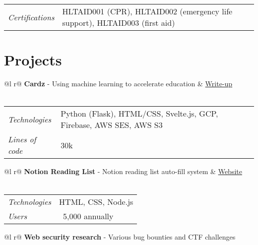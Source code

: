 \documentclass[a4paper,11pt]{article}
\begin{document}
\begin{tabularx}{\linewidth}{l X}
    \textit{Certifications} & \hfill HLTAID001 (CPR), HLTAID002 (emergency life support), HLTAID003 (first aid) \\
\end{tabularx}

\section{Projects}

\begin{tabularx}{\linewidth}{ @{}l r@{} }
\textbf{Cardz} - Using machine learning to accelerate education & \hfill \href{https://srg.id.au/posts/building-cardz}{Write-up} \\[3.75pt]
  \\

\end{tabularx}

\begin{tabularx}{\linewidth}{l X}
    \textit{Technologies} & \hfill Python (Flask), HTML/CSS, Svelte.js, GCP, Firebase, AWS SES, AWS S3 \\
    \textit{Lines of code} & \hfill 30k \\
\end{tabularx}

\begin{tabularx}{\linewidth}{ @{}l r@{} }
\textbf{Notion Reading List} - Notion reading list auto-fill system & \hfill \href{https://srg.id.au/notion-reading-list}{Website} \\[3.75pt]
  \\
\end{tabularx}

\begin{tabularx}{\linewidth}{l X}
    \textit{Technologies} & \hfill HTML, CSS, Node.js \\
    \textit{Users} & \hfill ~5,000 annually \\
\end{tabularx}

\begin{tabularx}{\linewidth}{ @{}l r@{} }
\textbf{Web security research} - Various bug bounties and CTF challenges \\[3.75pt]
  \\
\end{tabularx}
\end{document}
